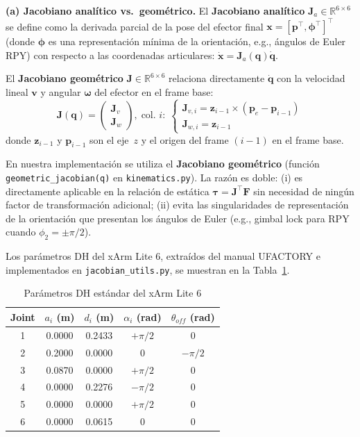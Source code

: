 \documentclass[journal,10pt,twoside]{IEEEtran}
\begin{document}
\textbf{(a) Jacobiano analítico vs.\ geométrico.}
El \textbf{Jacobiano analítico} $\bm{J}_a \in \mathbb{R}^{6\times6}$
se define como la derivada parcial de la pose del efector final
$\bm{x} = [\bm{p}^\top, \bm{\phi}^\top]^\top$ (donde $\bm{\phi}$ es
una representación mínima de la orientación, e.g., ángulos de Euler
RPY) con respecto a las coordenadas articulares:
$\dot{\bm{x}} = \bm{J}_a(\bm{q})\dot{\bm{q}}$.

El \textbf{Jacobiano geométrico} $\bm{J} \in \mathbb{R}^{6\times6}$
relaciona directamente $\dot{\bm{q}}$ con la velocidad lineal
$\bm{v}$ y angular $\bm{\omega}$ del efector en el frame base:
\begin{equation}
  \bm{J}(\bm{q}) =
  \begin{pmatrix} \bm{J}_v \\ \bm{J}_w \end{pmatrix},\;
  \text{col.\ } i{:}\;
  \begin{cases}
    \bm{J}_{v,i} = \bm{z}_{i-1} \!\times\! (\bm{p}_e - \bm{p}_{i-1}) \\
    \bm{J}_{w,i} = \bm{z}_{i-1}
  \end{cases}
  \label{eq:geom_jac}
\end{equation}
donde $\bm{z}_{i-1}$ y $\bm{p}_{i-1}$ son el eje~$z$ y el origen del
frame $(i{-}1)$ en el frame base.

En nuestra implementación se utiliza el \textbf{Jacobiano geométrico}
(función \texttt{geometric\_jacobian(q)} en \texttt{kinematics.py}).
La razón es doble: (i) es directamente aplicable en la relación de
estática $\bm{\tau} = \bm{J}^\top \bm{F}$ sin necesidad de ningún
factor de transformación adicional; (ii) evita las singularidades de
representación de la orientación que presentan los ángulos de Euler
(e.g., gimbal lock para RPY cuando $\phi_2 = \pm\pi/2$).

Los parámetros DH del xArm Lite 6, extraídos del manual UFACTORY e
implementados en \texttt{jacobian\_utils.py}, se muestran en la
Tabla~\ref{tab:dh}.

\begin{table}[h]
  \centering
  \caption{Parámetros DH estándar del xArm Lite 6}
  \label{tab:dh}
  \small
  \begin{tabular}{ccccc}
    \toprule
    \textbf{Joint} & $a_i$ (m) & $d_i$ (m) & $\alpha_i$ (rad) & $\theta_{off}$ (rad) \\
    \midrule
    1 & 0.0000 & 0.2433 & $+\pi/2$ & $0$       \\
    2 & 0.2000 & 0.0000 & $0$      & $-\pi/2$  \\
    3 & 0.0870 & 0.0000 & $+\pi/2$ & $0$       \\
    4 & 0.0000 & 0.2276 & $-\pi/2$ & $0$       \\
    5 & 0.0000 & 0.0000 & $+\pi/2$ & $0$       \\
    6 & 0.0000 & 0.0615 & $0$      & $0$       \\
    \bottomrule
  \end{tabular}
\end{table}
\end{document}

